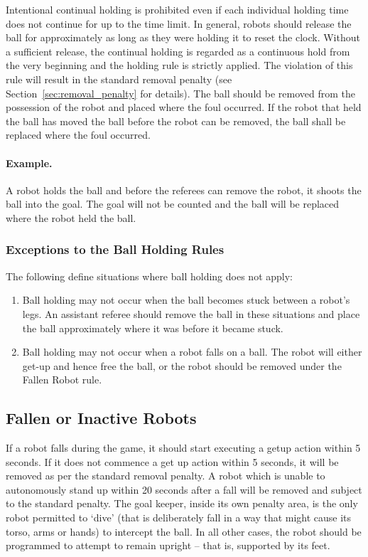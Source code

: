 \documentclass[12pt]{article}
\begin{document}
Intentional continual holding is prohibited even if each individual holding time does not continue for up to the time limit. In general, robots should release the ball for approximately as long as they were holding it to reset the clock. Without a sufficient release, the continual holding is regarded as a continuous hold from the very beginning and the holding rule is strictly applied. The violation of this rule will result in the standard removal penalty (see Section~\ref{sec:removal_penalty} for details). The ball should be removed from the possession of the robot and placed where the foul occurred. If the robot that held the ball has moved the ball before the robot can be removed, the ball shall be replaced where the foul occurred.

\paragraph{Example.} A robot holds the ball and before the referees
can remove the robot, it shoots the ball into the goal. The goal
will not be counted and the ball will be replaced where the robot
held the ball.

\subsubsection{Exceptions to the Ball Holding Rules}
\label{sec:situations_no_ball_holding}

The following define situations where ball holding does not apply:

\begin{enumerate}
	\item Ball holding may not occur when the ball becomes stuck between a robot's legs.  An assistant referee should remove the ball in these situations and place the ball approximately where it was before it became stuck.
	\item Ball holding may not occur when a robot falls on a ball.  The robot will either get-up and hence free the ball, or the robot should be removed under the Fallen Robot rule.
\end{enumerate}


\subsection{Fallen or Inactive Robots}
\label{sec:fallenrobots}

If a robot falls during the game, it should start executing a getup action within 5 seconds. If it does not commence a get up action within 5 seconds, it will be removed as per the standard removal penalty. A robot which is unable to autonomously stand up within 20 seconds after a fall will be removed and subject to the standard penalty. The goal keeper, inside its own penalty area, is the only robot permitted to `dive' (that is deliberately fall in a way that might cause its torso, arms or hands) to intercept the ball. In all other cases, the robot should be programmed to attempt to remain upright -- that is, supported by its feet.
\end{document}
